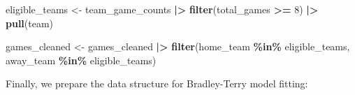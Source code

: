 \documentclass[
]{article}
\newenvironment{Shaded}{\begin{snugshade}}{\end{snugshade}}
\newcommand{\DecValTok}[1]{\textcolor[rgb]{0.00,0.00,0.81}{#1}}
\newcommand{\FunctionTok}[1]{\textcolor[rgb]{0.13,0.29,0.53}{\textbf{#1}}}
\newcommand{\NormalTok}[1]{#1}
\newcommand{\OtherTok}[1]{\textcolor[rgb]{0.56,0.35,0.01}{#1}}
\newcommand{\SpecialCharTok}[1]{\textcolor[rgb]{0.81,0.36,0.00}{\textbf{#1}}}
\begin{document}
\begin{Shaded}
\begin{Highlighting}[]
\NormalTok{eligible\_teams }\OtherTok{\textless{}{-}}\NormalTok{ team\_game\_counts }\SpecialCharTok{|\textgreater{}}
    \FunctionTok{filter}\NormalTok{(total\_games }\SpecialCharTok{\textgreater{}=} \DecValTok{8}\NormalTok{) }\SpecialCharTok{|\textgreater{}}
    \FunctionTok{pull}\NormalTok{(team)}

\NormalTok{games\_cleaned }\OtherTok{\textless{}{-}}\NormalTok{ games\_cleaned }\SpecialCharTok{|\textgreater{}}
    \FunctionTok{filter}\NormalTok{(home\_team }\SpecialCharTok{\%in\%}\NormalTok{ eligible\_teams, away\_team }\SpecialCharTok{\%in\%}\NormalTok{ eligible\_teams)}
\end{Highlighting}
\end{Shaded}

Finally, we prepare the data structure for Bradley-Terry model fitting:
\end{document}
